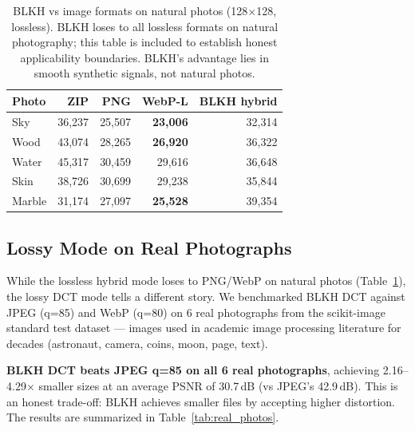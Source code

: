 \documentclass[11pt,a4paper]{article}
\begin{document}
\begin{table}[t]
\centering
\caption{BLKH vs image formats on natural photos (128$\times$128, lossless). BLKH loses to all lossless formats on natural photography; this table is included to establish honest applicability boundaries. BLKH's advantage lies in smooth synthetic signals, not natural photos.}
\label{tab:vs_formats}
\begin{tabular}{lrrrr}
\toprule
Photo & ZIP & PNG & WebP-L & BLKH hybrid \\
\midrule
Sky & 36,237 & 25,507 & \textbf{23,006} & 32,314 \\
Wood & 43,074 & 28,265 & \textbf{26,920} & 36,322 \\
Water & 45,317 & 30,459 & 29,616 & 36,648 \\
Skin & 38,726 & 30,699 & 29,238 & 35,844 \\
Marble & 31,174 & 27,097 & \textbf{25,528} & 39,354 \\
\bottomrule
\end{tabular}
\end{table}

\subsection{Lossy Mode on Real Photographs}

While the lossless hybrid mode loses to PNG/WebP on natural photos (Table~\ref{tab:vs_formats}), the lossy DCT mode tells a different story. We benchmarked BLKH DCT against JPEG (q=85) and WebP (q=80) on 6 real photographs from the scikit-image standard test dataset --- images used in academic image processing literature for decades (astronaut, camera, coins, moon, page, text).

\textbf{BLKH DCT beats JPEG q=85 on all 6 real photographs}, achieving 2.16--4.29$\times$ smaller sizes at an average PSNR of 30.7\,dB (vs JPEG's 42.9\,dB). This is an honest trade-off: BLKH achieves smaller files by accepting higher distortion. The results are summarized in Table~\ref{tab:real_photos}.
\end{document}
